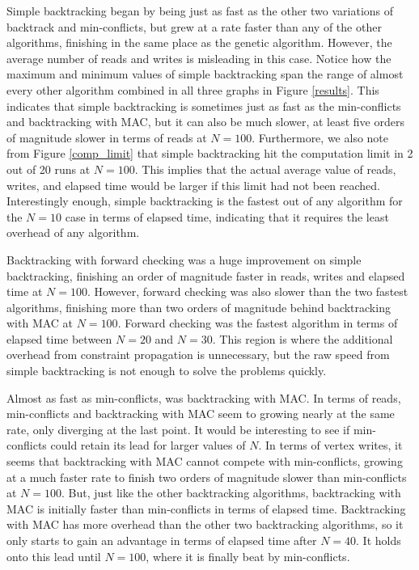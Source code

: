 \documentclass{article}
\begin{document}
		Simple backtracking began by being just as fast as the other two variations of backtrack and min-conflicts, but grew at a rate faster than any of the other algorithms, finishing in the same place as the genetic algorithm. However, the average number of reads and writes is misleading in this case. Notice how the maximum and minimum values of simple backtracking span the range of almost every other algorithm combined in all three graphs in Figure \ref{results}. This indicates that simple backtracking is sometimes just as fast as the min-conflicts and backtracking with MAC, but it can also be much slower, at least five orders of magnitude slower in terms of reads at $N=100$. Furthermore, we also note from Figure \ref{comp_limit} that simple backtracking hit the computation limit in 2 out of 20 runs at $N=100$. This implies that the actual average value of reads, writes, and elapsed time would be larger if this limit had not been reached. Interestingly enough, simple backtracking is the fastest out of any algorithm for the $N=10$ case in terms of elapsed time, indicating that it requires the least overhead of any algorithm.
		
		Backtracking with forward checking was a huge improvement on simple backtracking, finishing an order of magnitude faster in reads, writes and elapsed time at $N=100$. However, forward checking was also slower than the two fastest algorithms, finishing more than two orders of magnitude behind backtracking with MAC at $N=100$. Forward checking was the fastest algorithm in terms of elapsed time between $N=20$ and $N=30$. This region is where the additional overhead from constraint propagation is unnecessary, but the raw speed from simple backtracking is not enough to solve the problems quickly.
	
		Almost as fast as min-conflicts, was backtracking with MAC. In terms of reads, min-conflicts and backtracking with MAC seem to growing nearly at the same rate, only diverging at the last point. It would be interesting to see if min-conflicts could retain its lead for larger values of $N$. In terms of vertex writes, it seems that backtracking with MAC cannot compete with min-conflicts, growing at a much faster rate to finish two orders of magnitude slower than min-conflicts at $N=100$. But, just like the other backtracking algorithms, backtracking with MAC is initially faster than min-conflicts in terms of elapsed time. Backtracking with MAC has more overhead than the other two backtracking algorithms, so it only starts to gain an advantage in terms of elapsed time after $N=40$. It holds onto this lead until $N=100$, where it is finally beat by min-conflicts.
		
\end{document}
